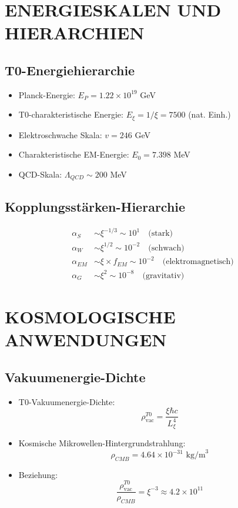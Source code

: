 \documentclass[12pt,a4paper]{article}
\begin{document}
	\section{ENERGIESKALEN UND HIERARCHIEN}
	
	\subsection{T0-Energiehierarchie}
	\begin{itemize}
		\item Planck-Energie: $E_P = 1.22 \times 10^{19}$ GeV
		\item T0-charakteristische Energie: $E_\xi = 1/\xi = 7500$ (nat. Einh.)
		\item Elektroschwache Skala: $v = 246$ GeV
		\item Charakteristische EM-Energie: $E_0 = 7.398$ MeV
		\item QCD-Skala: $\Lambda_{QCD} \sim 200$ MeV
	\end{itemize}
	
	\subsection{Kopplungsstärken-Hierarchie}
	\begin{align}
		\alpha_S &\sim \xi^{-1/3} \sim 10^{1} \quad \text{(stark)}\\
		\alpha_W &\sim \xi^{1/2} \sim 10^{-2} \quad \text{(schwach)}\\
		\alpha_{EM} &\sim \xi \times f_{EM} \sim 10^{-2} \quad \text{(elektromagnetisch)}\\
		\alpha_G &\sim \xi^2 \sim 10^{-8} \quad \text{(gravitativ)}
	\end{align}
	
	\section{KOSMOLOGISCHE ANWENDUNGEN}
	
	\subsection{Vakuumenergie-Dichte}
	\begin{itemize}
		\item T0-Vakuumenergie-Dichte:
		$$\rho_{\text{vac}}^{T0} = \frac{\xi \hbar c}{L_\xi^4}$$
		
		\item Kosmische Mikrowellen-Hintergrundstrahlung:
		$$\rho_{CMB} = 4.64 \times 10^{-31} \text{ kg/m}^3$$
		
		\item Beziehung:
		$$\frac{\rho_{\text{vac}}^{T0}}{\rho_{CMB}} = \xi^{-3} \approx 4.2 \times 10^{11}$$
	\end{itemize}
	
\end{document}
